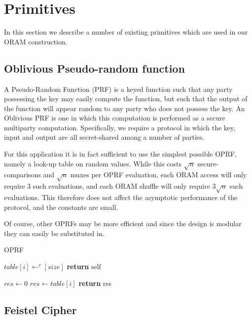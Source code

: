 
\section{Primitives}

In this section we describe a number of existing primitives which are
used in our ORAM construction.

\subsection{Oblivious Pseudo-random function}

A Pseudo-Random Function (PRF) is a keyed function such that
any party possessing the key may easily compute the function,
but such that the output of the function will appear random 
to any party who does not possess the key.
An Oblivious PRF is one in which this computation is performed
as a secure multiparty computation.
Specifically, we require a protocol in which the key, input
and output are all secret-shared among a number of parties.

For this application it is in fact sufficient to use the simplest possible
OPRF, namely a look-up table on random values.
While this costs $\sqrt{n}$ secure-comparisons and 
$\sqrt{n}$ muxes per OPRF evaluation,
each ORAM access will only require $3$ such evaluations,
and each ORAM shuffle will only require $3 \sqrt{n}$ such evaluations.
This therefore does not affect the asymptotic performance
of the protocol, and the constants are small.

Of course, other OPRFs may be more efficient and since the design
is modular they can easily be substituted in.

\begin{algorithm}
\caption{OPRF}
\label{alg:oprf}
\begin{algorithmic}[1]

 
    \State $table[i] \gets^r [size]$
\EndFor
\State \textbf{return} self
\EndProcedure

\State

\State $res \gets 0$
    \State $res \gets table[i]$
    \EndOblivIf
\EndFor
\State \textbf{return} res
\EndProcedure

\end{algorithmic}
\end{algorithm}


\subsection{Feistel Cipher}

